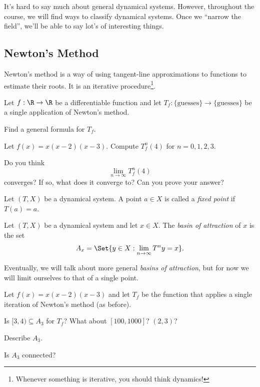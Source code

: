 	It's hard to say much about general dynamical systems.
	However, throughout the course, we will find ways to classify dynamical systems. Once we ``narrow the field'',
	we'll be able to say lot's of interesting things.

	\subsection*{Newton's Method}
	Newton's method is a way of using tangent-line approximations to functions to estimate their roots.
	It is an iterative procedure\footnote{ Whenever something is iterative, you should think dynamics!}.

	\question
	Let $f:\R\to\R$ be a differentiable function and let $T_f:\{\text{guesses}\}\to\{\text{guesses}\}$ be
	a single application of Newton's method.

	\begin{parts}
		\item Find a general formula for $T_f$.
		\item Let $f(x)=x(x-2)(x-3)$. Compute $T_f^n(4)$ for $n=0,1,2,3$.
		\item Do you think
			\[
				\lim_{n\to\infty} T_f^n(4)
			\]
			converges? If so, what does it converge to? Can you prove your answer?
	\end{parts}

	\begin{definition}
		Let $(T,X)$ be a dynamical system. A point $a\in X$ is called a \emph{fixed point} if
		$T(a)=a$.
	\end{definition}

	\begin{definition}
		Let $(T,X)$ be a dynamical system and let $x\in X$. The \emph{basin of attraction}
		of $x$ is the set
		\[
			A_x=\Set{y\in X: \lim_{n\to\infty} T^ny=x}.
		\]
	\end{definition}
	Eventually, we will talk about more general \emph{basins of attraction}, but for now we will limit ourselves to
	that of a single point.

	\question
	Let $f(x)=x(x-2)(x-3)$ and let $T_f$ be the function that applies a single iteration of Newton's method (as before).
	\begin{parts}
		\item Is $[3,4)\subseteq A_3$ for $T_f$? What about $[100, 1000]$? $(2,3)$?
		\item Describe $A_3$.
		\item Is $A_3$ connected?
	\end{parts}

